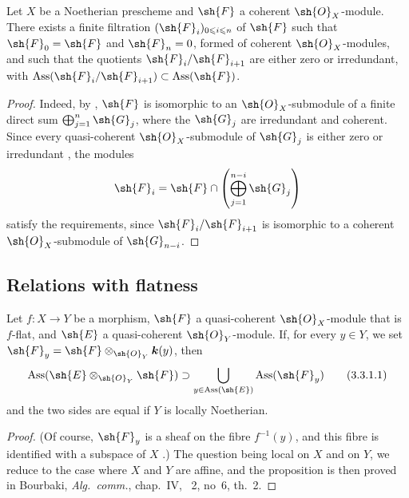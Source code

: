 \begin{corollary}[3.2.8]
\label{IV.3.2.8}
Let $X$ be a Noetherian prescheme and $\sh{F}$ a coherent $\sh{O}_X$-module.
There exists a finite filtration $(\sh{F}_i)_{0\leqslant i\leqslant n}$ of $\sh{F}$ such that $\sh{F}_0=\sh{F}$ and $\sh{F}_n=0$, formed of coherent $\sh{O}_X$-modules, and such that the quotients $\sh{F}_i/\sh{F}_{i+1}$ are either zero or irredundant, with $\operatorname{Ass}(\sh{F}_i/\sh{F}_{i+1})\subset\operatorname{Ass}(\sh{F})$.
\end{corollary}

\begin{proof}
Indeed, by , $\sh{F}$ is isomorphic to an $\sh{O}_X$-submodule of a finite direct sum $\bigoplus_{j=1}^n\sh{G}_j$, where the $\sh{G}_j$ are irredundant and coherent.  Since every quasi-coherent $\sh{O}_X$-submodule of $\sh{G}_j$ is either zero or irredundant , the modules
\[
\sh{F}_i=\sh{F}\cap\left(\bigoplus_{j=1}^{n-i}\sh{G}_j\right)
\]
satisfy the requirements, since $\sh{F}_i/\sh{F}_{i+1}$ is isomorphic to a coherent $\sh{O}_X$-submodule of $\sh{G}_{n-i}$.
\end{proof}

\subsection{Relations with flatness}
\label{subsection:IV.3.3}

\begin{proposition}[3.3.1]
\label{IV.3.3.1}
Let $f:X\to Y$ be a morphism, $\sh{F}$ a quasi-coherent $\sh{O}_X$-module that is $f$-flat, and $\sh{E}$ a quasi-coherent $\sh{O}_Y$-module.
If, for every $y\in Y$, we set $\sh{F}_y=\sh{F}\otimes_{\sh{O}_Y}\boldsymbol{k}(y)$, then
\[
\label{IV.3.3.1.1}
\operatorname{Ass}(\sh{E}\otimes_{\sh{O}_Y}\sh{F})\supset\bigcup_{y\in\operatorname{Ass}(\sh{E})}\operatorname{Ass}(\sh{F}_y)
\tag{3.3.1.1}
\]
and the two sides are equal if $Y$ is locally Noetherian.
\end{proposition}

\begin{proof}
(Of course, $\sh{F}_y$ is a sheaf on the fibre $f^{-1}(y)$, and this fibre is identified with a subspace of $X$ .)
The question being local on $X$ and on $Y$, we reduce to the case where $X$ and $Y$ are affine, and the proposition is then proved in Bourbaki, \emph{Alg.\ comm.}, chap.~IV, \textsection~2, no~6, th.~2.
\end{proof}

